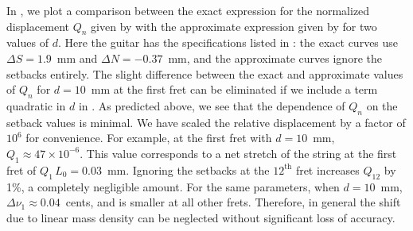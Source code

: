 
In , we plot a comparison between the exact expression for the normalized displacement $Q_n$ given by  with the approximate expression given by  for two values of $d$. Here the guitar has the specifications listed in : the exact curves use $\Delta S = 1.9$~mm and $\Delta N = -0.37$~mm, and the approximate curves ignore the setbacks entirely. The slight difference between the exact and approximate values of $Q_n$ for $d = 10$~mm at the first fret can be eliminated if we include a term quadratic in $d$ in . As predicted above, we see that the dependence of $Q_n$ on the setback values is minimal. We have scaled the relative displacement by a factor of $10^6$ for convenience. For example, at the first fret with $d = 10$~mm, $Q_1 \approx 47 \times 10^{-6}$. This value corresponds to a net stretch of the string at the first fret of $Q_1\, L_0 = 0.03$~mm. Ignoring the setbacks at the $12^{\textrm{th}}$ fret increases $Q_{12}$ by 1\%, a completely negligible amount. For the same parameters, when $d = 10$~mm, $\Delta \nu_{1} \approx 0.04$~cents, and is smaller at all other frets. Therefore, in general the shift due to linear mass density can be neglected without significant loss of accuracy.

